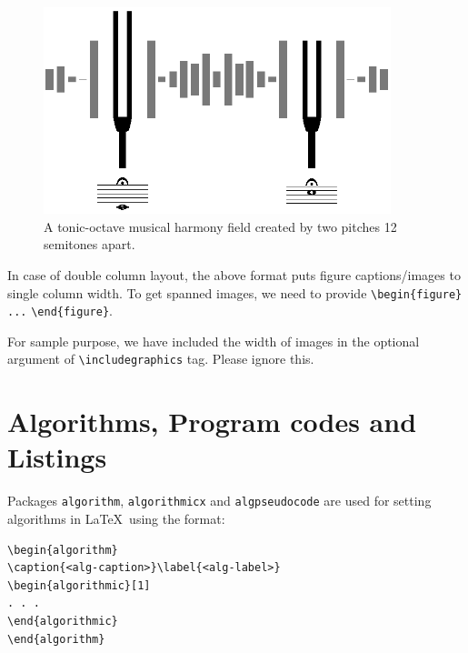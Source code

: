 \documentclass[sn-mathphys]{sn-jnl}%
\begin{document}
\begin{figure}[h]%
\centering
\includegraphics[width=0.9\textwidth]{tonicOctaveField.eps}
\caption{A tonic-octave musical harmony field created by two pitches 12 semitones apart.}\label{tonicOctaveFieldFig}
\end{figure}

In case of double column layout, the above format puts figure captions/images to single column width. To get spanned images, we need to provide \verb+\begin{figure}+ \verb+...+ \verb+\end{figure}+.

For sample purpose, we have included the width of images in the optional argument of \verb+\includegraphics+ tag. Please ignore this. 

\section{Algorithms, Program codes and Listings}\label{sec7}

Packages \verb+algorithm+, \verb+algorithmicx+ and \verb+algpseudocode+ are used for setting algorithms in \LaTeX\ using the format:

\bigskip
\begin{verbatim}
\begin{algorithm}
\caption{<alg-caption>}\label{<alg-label>}
\begin{algorithmic}[1]
. . .
\end{algorithmic}
\end{algorithm}
\end{verbatim}
\bigskip
\end{document}
